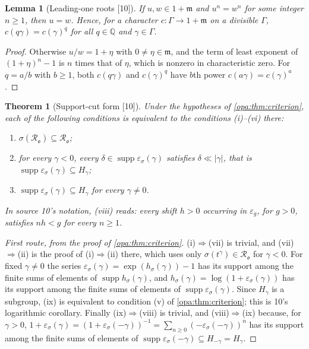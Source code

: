 \documentclass[11pt,oneside]{article}
\numberwithin{equation}{section}
\newtheorem{theorem}{Theorem}[section]
\newtheorem{lemma}[lemma]{Lemma}
\theoremstyle{definition}
\theoremstyle{remark}
\newcommand{\Q}{\mathbb Q}
\newcommand{\oo}{\mathfrak o}
\newcommand{\Ro}{\mathcal R_{\oo}}
\newcommand{\mm}{\mathfrak m}
\newcommand{\supp}{\operatorname{supp}}
\newcommand{\bb}{\mathbin{\ll}}
\newcommand{\src}[1]{\textup{\textsf{\small[#1]}}}
\begin{document}
\begin{lemma}[Leading-one roots \src{10}]\label{opa:sc:lem:root}
If $u,w\in1+\mm$ and $u^n=w^n$ for some integer $n\ge1$, then $u=w$. Hence,
for a character $c:\Gamma\to1+\mm$ on a divisible $\Gamma$, $c(q\gamma)=c(\gamma)^q$
for all $q\in\Q$ and $\gamma\in\Gamma$.
\end{lemma}
\begin{proof}
Otherwise $u/w=1+\eta$ with $0\ne\eta\in\mm$, and the term of least exponent
of $(1+\eta)^n-1$ is $n$ times that of $\eta$, which is nonzero in
characteristic zero. For $q=a/b$ with $b\ge1$, both $c(q\gamma)$ and
$c(\gamma)^q$ have $b$th power $c(a\gamma)=c(\gamma)^a$.
\end{proof}

\begin{theorem}[Support-cut form \src{10}]\label{opa:sc:thm:supportcut}
Under the hypotheses of \cref{opa:thm:criterion}, each of the following
conditions is equivalent to the conditions \textup{(i)}--\textup{(vi)} there:
\begin{enumerate}[label=\textup{(\roman*)},start=7,itemsep=1pt]
\item $\sigma(\Ro)\subseteq\Ro$;
\item for every $\gamma<0$, every $\delta\in\supp\varepsilon_\sigma(\gamma)$ satisfies
$\delta\bb|\gamma|$, that is $\supp\varepsilon_\sigma(\gamma)\subseteq H_\gamma$;
\item $\supp\varepsilon_\sigma(\gamma)\subseteq H_\gamma$ for every $\gamma\ne0$.
\end{enumerate}
In source 10's notation, \textup{(viii)} reads: every shift $h>0$ occurring in
$\varepsilon_g$, for $g>0$, satisfies $nh<g$ for every $n\ge1$.
\end{theorem}

\begin{proof}[First route, from the proof of \cref{opa:thm:criterion}]
(i)$\Rightarrow$(vii) is trivial, and (vii)$\Rightarrow$(ii) is the proof of
(i)$\Rightarrow$(ii) there, which uses only $\sigma(t^\gamma)\in\Ro$ for
$\gamma<0$. For fixed $\gamma\ne0$ the series $\varepsilon_\sigma(\gamma)=
\exp(h_\sigma(\gamma))-1$ has its support among the finite sums of elements of
$\supp h_\sigma(\gamma)$, and $h_\sigma(\gamma)=\log(1+\varepsilon_\sigma(\gamma))$
has its support among the finite sums of elements of
$\supp\varepsilon_\sigma(\gamma)$. Since $H_\gamma$ is a subgroup, (ix) is
equivalent to condition (v) of \cref{opa:thm:criterion}; this is 10's
logarithmic corollary. Finally (ix)$\Rightarrow$(viii) is trivial, and
(viii)$\Rightarrow$(ix) because, for $\gamma>0$,
$1+\varepsilon_\sigma(\gamma)=(1+\varepsilon_\sigma(-\gamma))^{-1}=
\sum_{n\ge0}(-\varepsilon_\sigma(-\gamma))^n$ has its support among the finite sums
of elements of $\supp\varepsilon_\sigma(-\gamma)\subseteq H_{-\gamma}=H_\gamma$.
\end{proof}
\end{document}
